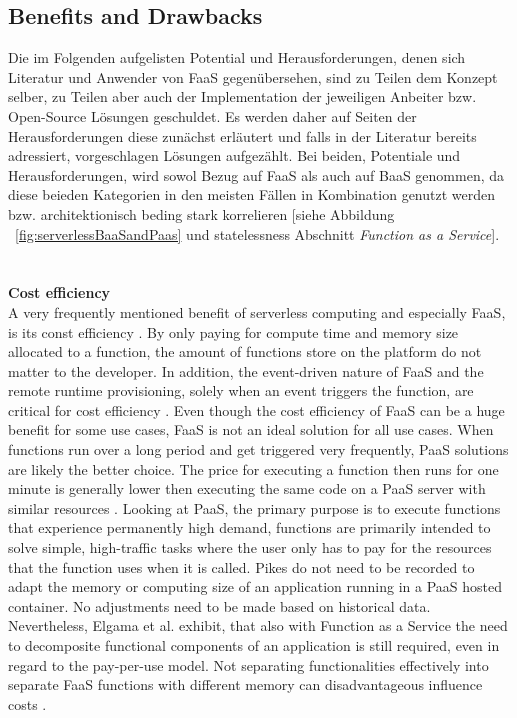 \documentclass[11pt]{article}
\begin{document}
\subsection{Benefits and Drawbacks}
Die im Folgenden aufgelisten Potential und Herausforderungen, denen sich Literatur und Anwender von FaaS gegenübersehen, sind zu Teilen dem Konzept selber, zu Teilen aber auch der Implementation der jeweiligen Anbeiter bzw. Open-Source Lösungen geschuldet. Es werden daher auf Seiten der Herausforderungen diese zunächst erläutert und falls in der Literatur bereits adressiert, vorgeschlagen Lösungen aufgezählt. Bei beiden, Potentiale und Herausforderungen, wird sowol Bezug auf FaaS als auch auf BaaS genommen, da diese beieden Kategorien in den meisten Fällen in Kombination genutzt werden bzw. architektionisch beding stark korrelieren [siehe Abbildung ~\ref{fig:serverlessBaaSandPaas} und \glqq statelessness\grqq{} Abschnitt \textit{Function as a Service}].\\\\ \\
\textbf{Cost efficiency}\\
A very frequently mentioned benefit of serverless computing and especially FaaS, is its const efficiency \cite{lee2018evaluation}. By only paying for compute time and memory size allocated to a function, the amount of functions store on the platform do not matter to the developer. In addition, the event-driven nature of FaaS and the remote runtime provisioning, solely when an event triggers the function, are critical for cost efficiency \cite{feng2018exploring}. Even though the cost efficiency of FaaS can be a huge benefit for some use cases, FaaS is not an ideal solution for all use cases. When functions run over a long period and get triggered very frequently, PaaS solutions are likely the better choice. The price for executing a function then runs for one minute is generally lower then executing the same code on a PaaS server with similar resources \cite{jonas2019cloud}. Looking at PaaS, the primary purpose is to execute functions that experience permanently high demand, functions are primarily intended to solve simple, high-traffic tasks where the user only has to pay for the resources that the function uses when it is called. Pikes do not need to be recorded to adapt the memory or computing size of an application running in a PaaS hosted container. No adjustments need to be made based on historical data. Nevertheless, Elgama et al. exhibit, that also with Function as a Service the need to decomposite functional components of an application is still required, even in regard to the pay-per-use model. Not separating functionalities effectively into separate FaaS functions with different memory can disadvantageous influence costs \cite{elgamal2018costless}.\\\\ 
\end{document}
